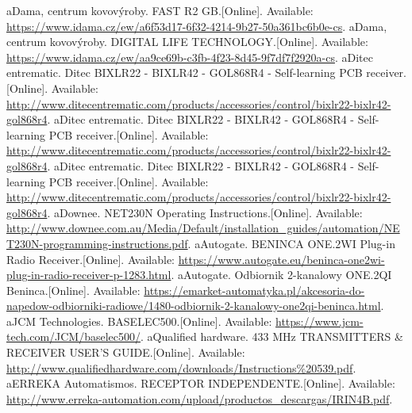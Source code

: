 \begin{thebibliography}{1}
	\bibitem aDama, centrum kovovýroby. FAST R2 GB.[Online]. Available: \href{https://www.idama.cz/ew/a6f53d17-6f32-4214-9b27-50a361bc6b0e-cs}{https://www.idama.cz/ew/a6f53d17-6f32-4214-9b27-50a361bc6b0e-cs}.
	\bibitem aDama, centrum kovovýroby. DIGITAL LIFE TECHNOLOGY.[Online]. Available: \href{https://www.idama.cz/ew/aa9ce69b-c3fb-4f23-8d45-9f7df7f2920a-cs}{https://www.idama.cz/ew/aa9ce69b-c3fb-4f23-8d45-9f7df7f2920a-cs}.
	\bibitem aDitec entrematic. Ditec BIXLR22 - BIXLR42 - GOL868R4 - Self-learning PCB receiver.[Online]. Available: \href{http://www.ditecentrematic.com/products/accessories/control/bixlr22-bixlr42-gol868r4}{http://www.ditecentrematic.com/products/accessories/control/bixlr22-bixlr42-gol868r4}.
	\bibitem aDitec entrematic. Ditec BIXLR22 - BIXLR42 - GOL868R4 - Self-learning PCB receiver.[Online]. Available: \href{http://www.ditecentrematic.com/products/accessories/control/bixlr22-bixlr42-gol868r4}{http://www.ditecentrematic.com/products/accessories/control/bixlr22-bixlr42-gol868r4}.
	\bibitem aDitec entrematic. Ditec BIXLR22 - BIXLR42 - GOL868R4 - Self-learning PCB receiver.[Online]. Available: \href{http://www.ditecentrematic.com/products/accessories/control/bixlr22-bixlr42-gol868r4}{http://www.ditecentrematic.com/products/accessories/control/bixlr22-bixlr42-gol868r4}.
	\bibitem aDownee. NET230N Operating Instructions.[Online]. Available: \href{http://www.downee.com.au/Media/Default/installation_guides/automation/NET230N-programming-instructions.pdf}{http://www.downee.com.au/Media/Default/installation\_guides/automation/NET230N-programming-instructions.pdf}.
	\bibitem aAutogate. BENINCA ONE.2WI Plug-in Radio Receiver.[Online]. Available: \href{https://www.autogate.eu/beninca-one2wi-plug-in-radio-receiver-p-1283.html}{https://www.autogate.eu/beninca-one2wi-plug-in-radio-receiver-p-1283.html}.
	\bibitem aAutogate. Odbiornik 2-kanalowy ONE.2QI Beninca.[Online]. Available: \href{https://emarket-automatyka.pl/akcesoria-do-napedow-odbiorniki-radiowe/1480-odbiornik-2-kanalowy-one2qi-beninca.html}{https://emarket-automatyka.pl/akcesoria-do-napedow-odbiorniki-radiowe/1480-odbiornik-2-kanalowy-one2qi-beninca.html}.
	\bibitem aJCM Technologies. BASELEC500.[Online]. Available: \href{https://www.jcm-tech.com/JCM/baselec500/}{https://www.jcm-tech.com/JCM/baselec500/}.
	\bibitem aQualified hardware. 433 MHz TRANSMITTERS \& RECEIVER USER'S GUIDE.[Online]. Available: \href{http://www.qualifiedhardware.com/downloads/Instructions\%20539.pdf}{http://www.qualifiedhardware.com/downloads/Instructions\%20539.pdf}.
	\bibitem aERREKA Automatismos. RECEPTOR INDEPENDENTE.[Online]. Available: \href{http://www.erreka-automation.com/upload/productos_descargas/IRIN4B.pdf}{http://www.erreka-automation.com/upload/productos\_descargas/IRIN4B.pdf}.

\end{thebibliography}

